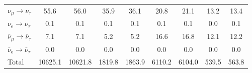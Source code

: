 \begin{table}[htbp]
{\begin{tabular}{lcccccccc}
$\nu_\mu \rightarrow \nu_\tau$                      & 55.6   & 56.0    & 35.9  & 36.1   & 20.8   & 21.1    & 13.2  & 13.4  \\
$\nu_\text{e} \rightarrow \nu_\tau$                 & 0.1    & 0.1     & 0.1   & 0.1    & 0.1    & 0.1     & 0.0   & 0.1   \\
$\bar{\nu}_\mu \rightarrow \bar{\nu}_\tau$          & 7.1    & 7.1     & 5.2   & 5.2    & 16.6   & 16.8    & 12.1  & 12.2  \\
$\bar{\nu}_\text{e} \rightarrow \bar{\nu}_\tau$     & 0.0    & 0.0     & 0.0   & 0.0    & 0.0    & 0.0     & 0.0   & 0.0   \\
Total                                               & 10625.1& 10621.8 & 1819.8& 1863.9 & 6110.2 & 6104.0  & 539.5 & 563.8 \\
\bottomrule
\end{tabular}
}
\end{table}
%


%
\begin{table}[htbp]
\centering
\caption{Total number of predicted oscillated events in the DUNE far detector complex for all samples ($\nu_\mu$: FHC numu, $\nu_\text{e}$: FHC nue, $\bar{\nu}_\mu$: RHC numu, $\bar{\nu}_\text{e}$: RHC nue), split into interaction channels. $\Gamma 
\neq 0$ means a decoherence strength of $\Gamma = 1.0\times10^{-15}$ eV. The reported data is rounded to one decimal place.}
\end{table}
%



